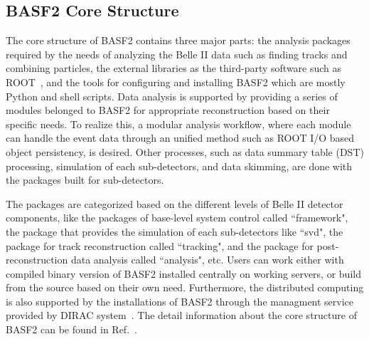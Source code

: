 
\subsection{BASF2 Core Structure}
The core structure of BASF2 contains three major parts: the analysis packages required by the needs of analyzing the Belle II data such as finding tracks and combining particles, the external libraries as the third-party software such as ROOT~\cite{ROOTcern}, and the tools for configuring and installing BASF2 which are mostly Python and shell scripts. Data analysis is supported by providing
a series of modules belonged to BASF2 for appropriate reconstruction based on their specific
needs. To realize this, a modular analysis workflow, where each module can handle the event
data through an unified method such as ROOT I/O based object persistency, is desired. Other
processes, such as data summary table (DST) processing, simulation of each sub-detectors, and data skimming, are done with the packages built for sub-detectors.

The packages are categorized based on the different levels of Belle II detector components, like the packages of base-level system control called ``framework", the package that provides the simulation of each sub-detectors like ``svd",  the package for track reconstruction called ``tracking",  and the package for post-reconstruction data analysis called ``analysis", etc. Users can work either with compiled binary version of BASF2 installed centrally on working servers, or build from the source based on their own need. Furthermore, the distributed computing is also supported by the installations of BASF2 through the managment service provided by DIRAC system~\cite{dirac}. The detail information about the core structure of BASF2 can be found in Ref.~\cite{kuhr2019belle}. 




